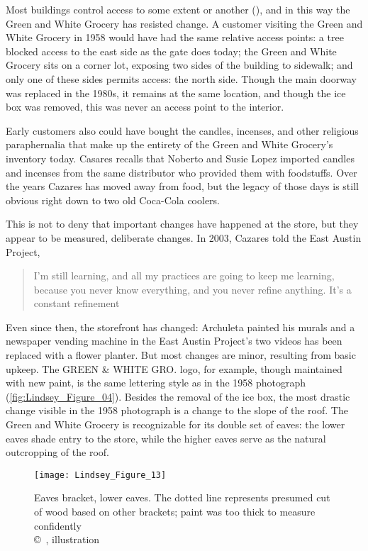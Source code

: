 Most buildings control access to some extent or another (\cites{campion}[52]{glassie}), and in this way the Green and White Grocery has resisted change. A customer visiting the Green and White Grocery in 1958 would have had the same relative access points: a tree blocked access to the east side as the gate does today; the Green and White Grocery sits on a corner lot, exposing two sides of the building to sidewalk; and only one of these sides permits access: the north side. Though the main doorway was replaced in the 1980s, it remains at the same location, and though the ice box was removed, this was never an access point to the interior.



Early customers also could have bought the candles, incenses, and other religious paraphernalia that make up the entirety of the Green and White Grocery's inventory today. Casares recalls that Noberto and Susie Lopez imported candles and incenses from the same distributor who provided them with foodstuffs. Over the years Cazares has moved away from food, but the legacy of those days is still obvious right down to two old Coca-Cola coolers.

This is not to deny that important changes have happened at the store, but they appear to be measured, deliberate changes. In 2003, Cazares told the East Austin Project, \blockcquote{becker}{I'm still learning, and all my practices are going to keep me learning, because you never know everything, and you never refine anything. It's a constant refinement}. Even since then, the storefront has changed: Archuleta painted his murals and a newspaper vending machine in the East Austin Project’s two videos has been replaced with a flower planter. But most changes are minor, resulting from basic upkeep. The GREEN \& WHITE GRO. logo, for example, though maintained with new paint, is the same lettering style as in the 1958 photograph (\cref{fig:Lindsey_Figure_04}). Besides the removal of the ice box, the most drastic change visible in the 1958 photograph is a change to the slope of the roof. The Green and White Grocery is recognizable for its double set of eaves: the lower eaves shade entry to the store, while the higher eaves serve as the natural outcropping of the roof.

\begin{wrapfigure}{O}[3cm]{0.5\textwidth}
	\texttt{[image: Lindsey\_Figure\_13]}
	\caption{Eaves bracket, lower eaves. The dotted line represents presumed cut of wood based on other brackets; paint was too thick to measure confidently\\
		{\normalfont\scriptsize \copyright\
			\shortauthor, illustration
	}}
	\label{fig:Lindsey_Figure_13}
\end{wrapfigure}

